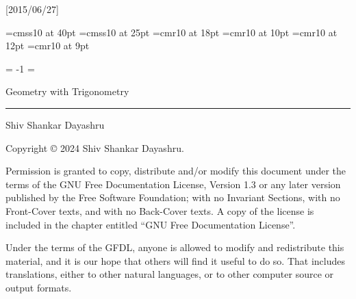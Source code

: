 

\beginpackages
  \usepackage{url}[2015/06/27]
  \usepackage[dvipsnames]{color}
\endpackages
\enablehyperlinks
{}

\font\titlefont=cmss10 at 40pt
\font\subtitlefont=cmss10 at 25pt
\font\authorfont=cmr10 at 18pt
\font\chaptitlefont=cmr10 at 10pt
\font\partfont=cmr10 at 12pt
\font\sectionfont=cmr10 at 9pt



\pageno = -1
\begingroup
  \nopagenumbers
  \headline={\kern-2in}
  ~~~
  \vskip 2cm
  \titlefont\centerline{\color{white}Geometry with
Trigonometry}
  \vskip 2mm
  {\color{white}\hrule}
  \vskip 2mm
  \subtitlefont{}
  \vskip 1.5cm
  \vfill
  \authorfont\color{white}Shiv Shankar Dayashru
  \color{black}
  \vfil
  \eject
\endgroup
\color{black}
\rewritetocfiletrue %
\completebooktrue
\edgetabsfalse
%
\noheadlinetrue
\sinkage

\bigskip

\bigskip

\vskip 2in
\noindent Copyright \copyright{} 2024 Shiv Shankar Dayashru.

\bigskip
\noindent Permission is granted to copy, distribute and/or modify this
document under the terms of the GNU Free Documentation License, Version
1.3 or any later version published by the Free Software Foundation; with
no Invariant Sections, with no Front-Cover texts, and with no Back-Cover
texts.  A copy of the license is included in the chapter entitled ``GNU
Free Documentation License''.

\medskip\noindent
Under the terms of the GFDL, anyone is allowed to modify and
redistribute this material, and it is our hope that others will find it
useful to do so.  That includes translations, either to other natural
languages, or to other computer source or output formats.

